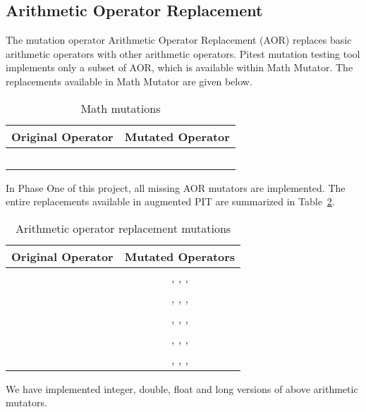 \subsection{Arithmetic Operator Replacement}
The mutation operator Arithmetic Operator Replacement (AOR) replaces basic arithmetic operators with other arithmetic operators.
Pitest mutation testing tool implements only a subset of AOR, which is available within Math Mutator.
The replacements available in Math Mutator are given below.

\begin{table}
  \centering
  \begin{tabular}{c c}
    \toprule
    Original Operator & Mutated Operator \\
    \midrule
    \java{+}          & \java{-}         \\
    \java{-}          & \java{+}         \\
    \java{*}          & \java{/}         \\
    \java{/}          & \java{*}         \\
    \java{\%}         & \java{*}         \\
    \bottomrule
  \end{tabular}
  \caption[Math mutations]{Math mutations}
  \label{tab:math:src_ops}
\end{table}

In Phase One of this project, all missing AOR mutators are implemented.
The entire replacements available in augmented PIT are summarized in Table~\ref{tab:aor:src_ops}.

\begin{table}
  \centering
  \begin{tabular}{c c}
    \toprule
    Original Operator & Mutated Operators                                           \\
    \midrule
    \java{+}          & \phantom{\java{+},} \java{-}, \java{*}, \java{/}, \java{\%} \\
    \java{-}          & \java{+}, \phantom{\java{-},} \java{*}, \java{/}, \java{\%} \\
    \java{*}          & \java{+}, \java{-}, \phantom{\java{*},} \java{/}, \java{\%} \\
    \java{/}          & \java{+}, \java{-}, \java{*}, \phantom{\java{/},} \java{\%} \\
    \java{\%}         & \java{+}, \java{-}, \java{*}, \java{/}\phantom{, \java{\%}} \\
    \bottomrule
  \end{tabular}
  \caption[AOR mutations]{Arithmetic operator replacement mutations}
  \label{tab:aor:src_ops}
\end{table}

We have implemented integer, double, float and long versions of above arithmetic mutators.

